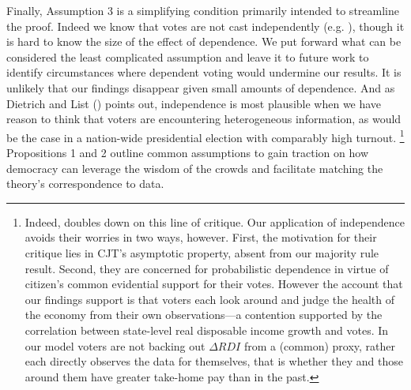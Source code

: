 \documentclass[11pt]{article}
\begin{document}

Finally, Assumption 3 is a simplifying condition primarily intended  to streamline the proof. Indeed we know that votes are not cast independently (e.g. \citet{sinclair2012social}), though it is hard to know the size of the effect of dependence. We put forward what can be considered the least complicated assumption and leave it to future work to identify circumstances where dependent voting would undermine our results. It is unlikely that our findings disappear given small amounts of dependence. And as Dietrich and List (\citeyear{Dietrich2004}) points out, independence is most plausible when we have reason to think that voters are encountering heterogeneous information, as would be the case in a nation-wide presidential election with comparably high turnout. \footnote{Indeed, \cite{dietrich2013epistemic} doubles down on this line of critique. Our application of independence avoids their worries in two ways, however. First, the motivation for their critique lies in CJT's asymptotic property, absent from our majority rule result. Second, they are concerned for  probabilistic dependence  in virtue of citizen's common evidential support for their votes. However the account that our findings support is that voters each look around and judge the health of the economy from their own observations---a contention supported by the correlation between state-level real disposable income growth and votes. In our model voters are not backing out $\Delta RDI$ from a (common) proxy, rather each directly observes the data for themselves, that is whether they and those around them have greater take-home pay than in the past. }
Propositions 1 and 2 outline common assumptions to gain traction on how democracy can leverage the wisdom of the crowds and facilitate matching the theory's correspondence to data.
\end{document}
